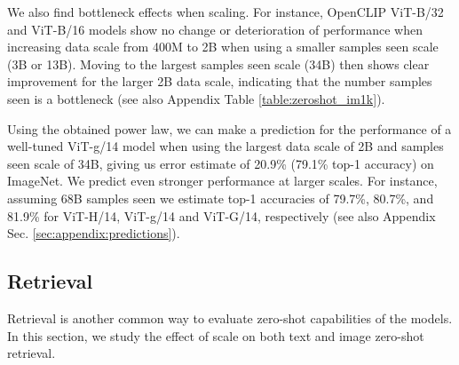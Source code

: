 \documentclass[11pt,table]{article}
\begin{document}
We also find bottleneck effects when scaling. For instance, OpenCLIP ViT-B/32 and ViT-B/16 models show no change or deterioration of performance when increasing data scale from 400M to 2B when using a smaller samples seen scale (3B or 13B). Moving to the largest samples seen scale (34B) then shows clear improvement for the larger 2B data scale, indicating that the number samples seen is a bottleneck (see also Appendix Table \ref{table:zeroshot_im1k}).




Using the obtained power law, we can make a prediction for the performance of a well-tuned ViT-g/14 model when using the largest data scale of 2B and samples seen scale of 34B, giving us error estimate of 20.9\% (79.1\% top-1 accuracy) on ImageNet. We predict even stronger performance at larger scales. For instance, assuming 68B samples seen we estimate top-1 accuracies of 79.7\%, 80.7\%, and 81.9\% for ViT-H/14, ViT-g/14 and ViT-G/14, respectively (see also Appendix Sec. \ref{sec:appendix:predictions}).


\subsection{Retrieval}
\label{subsect:scaling_laws_retrieval}

Retrieval is another common way to evaluate zero-shot capabilities of the models. In this section, we study the effect of scale on both text and image zero-shot retrieval.
\end{document}
